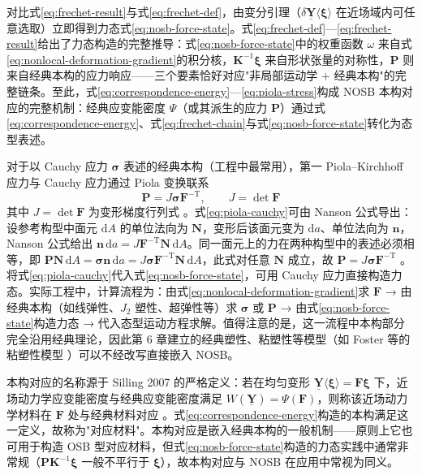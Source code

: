对比式\eqref{eq:frechet-result}与式\eqref{eq:frechet-def}，由变分引理（$\delta\underline{\mathbf{Y}}\langle\boldsymbol{\xi}\rangle$ 在近场域内可任意选取）立即得到力态式\eqref{eq:nosb-force-state}。式\eqref{eq:frechet-def}—\eqref{eq:frechet-result}给出了力态构造的完整推导：式\eqref{eq:nosb-force-state}中的权重函数 $\omega$ 来自式\eqref{eq:nonlocal-deformation-gradient}的积分核，$\mathbf{K}^{-1}\boldsymbol{\xi}$ 来自形状张量的对称性，$\mathbf{P}$ 则来自经典本构的应力响应——三个要素恰好对应"非局部运动学 + 经典本构"的完整链条。至此，式\eqref{eq:correspondence-energy}—\eqref{eq:piola-stress}构成 NOSB 本构对应的完整机制：经典应变能密度 $\Psi$（或其派生的应力 $\mathbf{P}$）通过式\eqref{eq:correspondence-energy}、式\eqref{eq:frechet-chain}与式\eqref{eq:nosb-force-state}转化为态型表述。

对于以 Cauchy 应力 $\boldsymbol{\sigma}$ 表述的经典本构（工程中最常用），第一 Piola–Kirchhoff 应力与 Cauchy 应力通过 Piola 变换联系
\begin{equation}
  \mathbf{P}=J\boldsymbol{\sigma}\mathbf{F}^{-\mathrm{T}},\qquad J=\det\mathbf{F}
  \label{eq:piola-cauchy}
\end{equation}
其中 $J=\det\mathbf{F}$ 为变形梯度行列式 \cite{Silling2007,SillingLehoucq2010}。式\eqref{eq:piola-cauchy}可由 Nanson 公式导出：设参考构型中面元 $\mathrm{d}A$ 的单位法向为 $\mathbf{N}$，变形后该面元变为 $\mathrm{d}a$、单位法向为 $\mathbf{n}$，Nanson 公式给出 $\mathbf{n}\,\mathrm{d}a=J\mathbf{F}^{-\mathrm{T}}\mathbf{N}\,\mathrm{d}A$。同一面元上的力在两种构型中的表述必须相等，即 $\mathbf{P}\mathbf{N}\,\mathrm{d}A=\boldsymbol{\sigma}\mathbf{n}\,\mathrm{d}a=J\boldsymbol{\sigma}\mathbf{F}^{-\mathrm{T}}\mathbf{N}\,\mathrm{d}A$，此式对任意 $\mathbf{N}$ 成立，故 $\mathbf{P}=J\boldsymbol{\sigma}\mathbf{F}^{-\mathrm{T}}$ \cite{Silling2007}。将式\eqref{eq:piola-cauchy}代入式\eqref{eq:nosb-force-state}，可用 Cauchy 应力直接构造力态。实际工程中，计算流程为：由式\eqref{eq:nonlocal-deformation-gradient}求 $\mathbf{F}$ → 由经典本构（如线弹性、$J_{2}$ 塑性、超弹性等）求 $\boldsymbol{\sigma}$ 或 $\mathbf{P}$ → 由式\eqref{eq:nosb-force-state}构造力态 → 代入态型运动方程求解。值得注意的是，这一流程中本构部分完全沿用经典理论，因此第 6 章建立的经典塑性、粘塑性等模型（如 Foster 等的粘塑性模型 \cite{Foster2010}）可以不经改写直接嵌入 NOSB。

\begin{remark}
  本构对应的名称源于 Silling 2007 的严格定义：若在均匀变形 $\underline{\mathbf{Y}}\langle\boldsymbol{\xi}\rangle=\mathbf{F}\boldsymbol{\xi}$ 下，近场动力学应变能密度与经典应变能密度满足 $W(\underline{\mathbf{Y}})=\Psi(\mathbf{F})$，则称该近场动力学材料在 $\mathbf{F}$ 处与经典材料对应 \cite{Silling2007}。式\eqref{eq:correspondence-energy}构造的本构满足这一定义，故称为"对应材料"。本构对应是嵌入经典本构的一般机制——原则上它也可用于构造 OSB 型对应材料，但式\eqref{eq:nosb-force-state}构造的力态实践中通常非常规（$\mathbf{P}\mathbf{K}^{-1}\boldsymbol{\xi}$ 一般不平行于 $\boldsymbol{\xi}$），故本构对应与 NOSB 在应用中常视为同义。
\end{remark}

